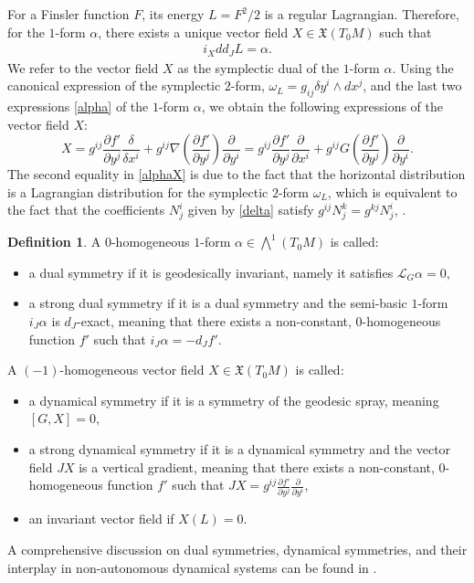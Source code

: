 \documentclass[oneside,english]{amsart}
\theoremstyle{definition}
\newtheorem{definition}[theorem]{Definition}
\theoremstyle{plain}
\theoremstyle{plain}
\theoremstyle{plain}
\theoremstyle{remark}
\theoremstyle{remark}
\theoremstyle{remark}
\begin{document}
For a Finsler function $F$, its energy $L=F^2/2$ is a regular Lagrangian. Therefore, for the $1$-form $\alpha$, there exists a unique vector field $X\in\mathfrak{X}(T_0M)$ such that 
\begin{eqnarray}
i_Xdd_JL=\alpha. \label{ixalpha}
\end{eqnarray}
We refer to the vector field $X$ as the symplectic dual of the $1$-form $\alpha$. Using the canonical expression of the symplectic $2$-form, $\omega_L=g_{ij}\delta y^i \wedge dx^j$, and the last two expressions \eqref{alpha} of the $1$-form $\alpha$, we obtain the following expressions of the vector field $X$:
\begin{equation} \label{alphaX}
X=g^{ij}\dfrac{\partial f'}{\partial y^j}\dfrac{\delta}{\delta x^i} + g^{ij}\nabla\left(\dfrac{\partial f'}{\partial y^j}\right)\dfrac{\partial}{\partial y^i} = g^{ij}\dfrac{\partial f'}{\partial y^j}\dfrac{\partial}{\partial x^i} + g^{ij}G\left(\dfrac{\partial f'}{\partial y^j}\right)\dfrac{\partial}{\partial y^i} .
\end{equation}
The second equality in \eqref{alphaX} is due to the fact that the horizontal distribution is a Lagrangian distribution for the symplectic $2$-form $\omega_L$, which is equivalent to the fact that the coefficients $N^i_j$ given by \eqref{delta} satisfy $g^{ij}N_j^k=g^{kj}N_j^i$, \cite{Bucataru07}.

\begin{definition}
A $0$-homogeneous $1$-form $\alpha\in \bigwedge^1(T_0M)$ is called: 
\begin{itemize}
\item[(1)]
a dual symmetry if it is geodesically invariant, namely it satisfies $\mathcal{L}_G\alpha=0$,
\item[(2)] a strong dual symmetry if it is a dual symmetry and the semi-basic $1$-form $i_J\alpha$ is $d_J$-exact, meaning that there exists a non-constant, $0$-homogeneous function $f'$ such that $i_J\alpha=-d_Jf'$.
\end{itemize}
A $(-1)$-homogeneous vector field $X\in \mathfrak{X}(T_0M)$ is called:
\begin{itemize}
\item[(3)] a dynamical symmetry if it is a symmetry of the geodesic spray, meaning $[G,X]=0$,
\item[(4)] a strong dynamical symmetry if it is a dynamical symmetry and the vector field $JX$ is a vertical gradient, meaning that there exists a non-constant, $0$-homogeneous function $f'$ such that $JX=g^{ij}\frac{\partial f'}{\partial y^j} \frac{\partial}{\partial y^i}$,
\item[(5)] an invariant vector field if $X(L)=0$.
\end{itemize}
\end{definition}
A comprehensive discussion on dual symmetries, dynamical symmetries, and their interplay in non-autonomous dynamical systems can be found in \cite{MP95}.
\end{document}
